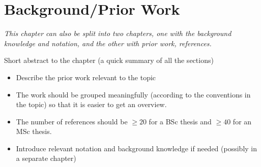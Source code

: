 \chapter{Background/Prior Work}
\label{ch:background}
\emph{This chapter can also be split into two chapters, one with the background knowledge and notation, and the other with prior work, references.}

Short abstract to the chapter (a quick summary of all the sections)

\begin{itemize}
\item Describe the prior work relevant to the topic
\item The work should be grouped meaningfully (according to the conventions in the topic) so that it is easier to get an overview.
\item The number of references should be $\ge 20$ for a BSc thesis and $\ge 40$ for an MSc thesis.
\item Introduce relevant notation and background knowledge if needed (possibly in a separate chapter)
\end{itemize}
